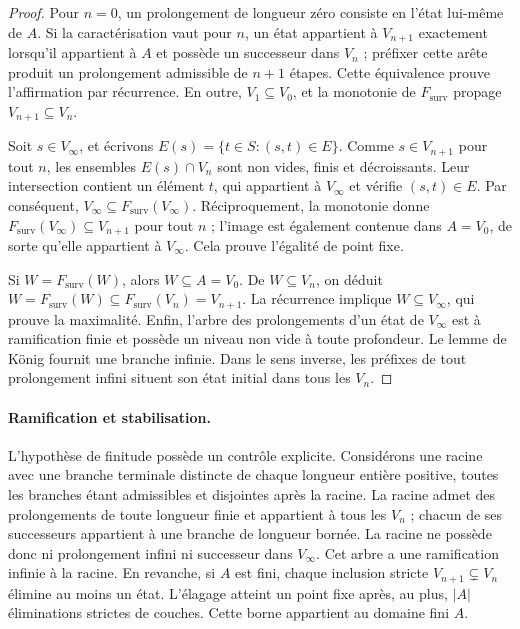 \begin{proof}
Pour \(n=0\), un prolongement de longueur zéro consiste en l'état lui-même de \(A\). Si la caractérisation vaut pour \(n\), un état appartient à \(V_{n+1}\) exactement lorsqu'il appartient à \(A\) et possède un successeur dans \(V_n\) ; préfixer cette arête produit un prolongement admissible de \(n+1\) étapes. Cette équivalence prouve l'affirmation par récurrence. En outre, \(V_1\subseteq V_0\), et la monotonie de \(F_{\mathrm{surv}}\) propage \(V_{n+1}\subseteq V_n\).

Soit \(s\in V_\infty\), et écrivons
\(E(s)=\{t\in S:(s,t)\in E\}\). Comme \(s\in V_{n+1}\) pour tout \(n\),
les ensembles \(E(s)\cap V_n\) sont non vides, finis et décroissants.
Leur intersection contient un élément \(t\), qui appartient à
\(V_\infty\) et vérifie \((s,t)\in E\). Par conséquent,
\(V_\infty\subseteq F_{\mathrm{surv}}(V_\infty)\).
Réciproquement, la monotonie donne
\(F_{\mathrm{surv}}(V_\infty)\subseteq V_{n+1}\) pour tout \(n\) ;
l’image est également contenue dans \(A=V_0\), de sorte qu’elle appartient à
\(V_\infty\). Cela prouve l’égalité de point fixe.

Si \(W=F_{\mathrm{surv}}(W)\), alors \(W\subseteq A=V_0\).
De \(W\subseteq V_n\), on déduit
\(W=F_{\mathrm{surv}}(W)\subseteq F_{\mathrm{surv}}(V_n)=V_{n+1}\).
La récurrence implique \(W\subseteq V_\infty\), qui prouve la maximalité.
Enfin, l’arbre des prolongements d’un état de \(V_\infty\)
est à ramification finie et possède un niveau non vide à toute profondeur.
Le lemme de König fournit une branche infinie. Dans le sens inverse, les
préfixes de tout prolongement infini situent son état initial
dans tous les \(V_n\).
\end{proof}

\paragraph{Ramification et stabilisation.}
L'hypothèse de finitude possède un contrôle explicite. Considérons une racine avec une branche terminale distincte de chaque longueur entière positive, toutes les branches étant admissibles et disjointes après la racine. La racine admet des prolongements de toute longueur finie et appartient à tous les \(V_n\) ; chacun de ses successeurs appartient à une branche de longueur bornée. La racine ne possède donc ni prolongement infini ni successeur dans \(V_\infty\). Cet arbre a une ramification infinie à la racine.
En revanche, si \(A\) est fini, chaque inclusion stricte \(V_{n+1}\subsetneq V_n\) élimine au moins un état. L'élagage atteint un point fixe après, au plus, \(|A|\) éliminations strictes de couches. Cette borne appartient au domaine fini \(A\).

